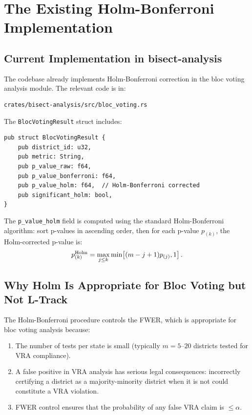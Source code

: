 \section{The Existing Holm-Bonferroni Implementation}
\label{sec:impl}

\subsection{Current Implementation in bisect-analysis}

The \bisect{} codebase already implements Holm-Bonferroni correction
in the bloc voting analysis module.
The relevant code is in:
\begin{verbatim}
crates/bisect-analysis/src/bloc_voting.rs
\end{verbatim}

The \texttt{BlocVotingResult} struct includes:
\begin{verbatim}
pub struct BlocVotingResult {
    pub district_id: u32,
    pub metric: String,
    pub p_value_raw: f64,
    pub p_value_bonferroni: f64,
    pub p_value_holm: f64,  // Holm-Bonferroni corrected
    pub significant_holm: bool,
}
\end{verbatim}

The \texttt{p\_value\_holm} field is computed using the standard
Holm-Bonferroni algorithm: sort p-values in ascending order, then
for each p-value $p_{(k)}$, the Holm-corrected p-value is:
\[
  p_{(k)}^{\rm Holm} = \max_{j \leq k} \min\!\left[(m - j + 1) p_{(j)}, 1\right].
\]

\subsection{Why Holm Is Appropriate for Bloc Voting but Not L-Track}

The Holm-Bonferroni procedure controls the FWER, which is appropriate
for bloc voting analysis because:
\begin{enumerate}
\item The number of tests per state is small (typically $m = 5$--$20$
  districts tested for VRA compliance).
\item A false positive in VRA analysis has serious legal consequences:
  incorrectly certifying a district as a majority-minority district when
  it is not could constitute a VRA violation.
\item FWER control ensures that the probability of any false VRA claim
  is $\leq \alpha$.
\end{enumerate}


